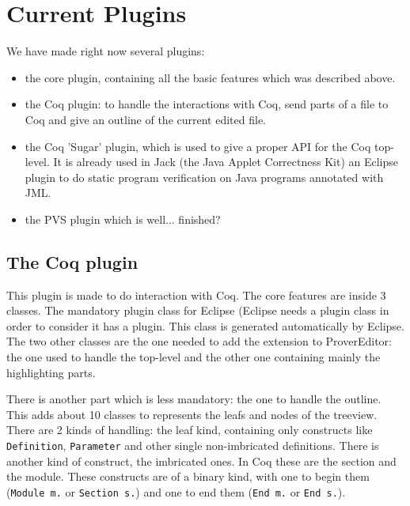 \documentclass{entcs}
\begin{document}


\section{Current Plugins}
\label{sec:current-plugins}

We have made right now several plugins:
\begin{itemize}
\item the core plugin, containing all the basic features which was 
described above.
\item the Coq plugin: to handle the interactions with Coq, send parts of a 
file to Coq
and give an outline of the current edited file.
\item the Coq 'Sugar' plugin, which is used to give a proper API for the 
Coq top-level.
It is already used in Jack \cite{Jack-Web} (the Java Applet Correctness Kit) 
an Eclipse plugin to do static program verification on Java programs 
annotated with JML.

\item the PVS plugin which is well... finished?
\end{itemize}

\subsection{The Coq plugin}
\label{subsec:coq-plugin}

This plugin is made to do interaction with Coq. The core features
are inside 3 classes. The mandatory plugin class for Eclipse (Eclipse
needs a plugin class in order to consider it has a plugin. This class
is generated automatically by Eclipse. The two other classes are the one
needed to add the extension to ProverEditor: the one used to handle the
top-level and the other one containing mainly the highlighting parts.

There is another part which is less mandatory: the one to handle the outline.
This adds about 10 classes to represents the leafs and nodes of the treeview.
There are 2 kinds of handling: the leaf kind, containing only constructs
like {\tt Definition}, {\tt Parameter} and other single non-imbricated
definitions. There is another kind of construct, the imbricated ones.
In Coq these are the section and the module. These constructs are of
a binary kind, with one to begin them ({\tt Module m.} or {\tt Section s.})
and one to end them ({\tt End m.} or {\tt End s.}).\\
\end{document}
